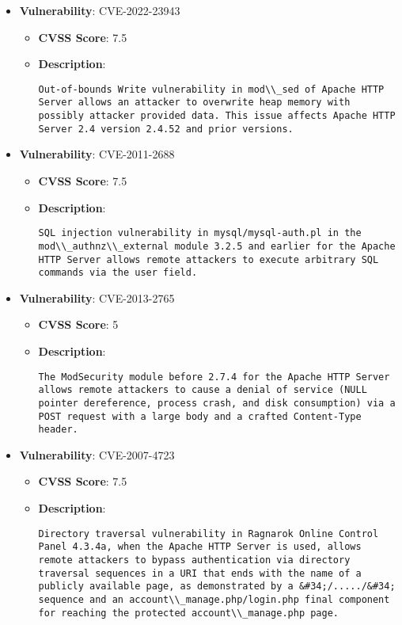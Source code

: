 \documentclass{article}
\begin{document}
\begin{itemize}
        \item \textbf{Vulnerability}: CVE-2022-23943
        \begin{itemize}
            \item \textbf{CVSS Score}:  7.5 
            \item \textbf{Description}:
            \parbox[t]{0.9\linewidth}{
                \verb|Out-of-bounds Write vulnerability in mod\\_sed of Apache HTTP Server allows an attacker to overwrite heap memory with possibly attacker provided data. This issue affects Apache HTTP Server 2.4 version 2.4.52 and prior versions.|
            }
        \end{itemize}
    
        \item \textbf{Vulnerability}: CVE-2011-2688
        \begin{itemize}
            \item \textbf{CVSS Score}:  7.5 
            \item \textbf{Description}:
            \parbox[t]{0.9\linewidth}{
                \verb|SQL injection vulnerability in mysql/mysql-auth.pl in the mod\\_authnz\\_external module 3.2.5 and earlier for the Apache HTTP Server allows remote attackers to execute arbitrary SQL commands via the user field.|
            }
        \end{itemize}
    
        \item \textbf{Vulnerability}: CVE-2013-2765
        \begin{itemize}
            \item \textbf{CVSS Score}:  5 
            \item \textbf{Description}:
            \parbox[t]{0.9\linewidth}{
                \verb|The ModSecurity module before 2.7.4 for the Apache HTTP Server allows remote attackers to cause a denial of service (NULL pointer dereference, process crash, and disk consumption) via a POST request with a large body and a crafted Content-Type header.|
            }
        \end{itemize}
    
        \item \textbf{Vulnerability}: CVE-2007-4723
        \begin{itemize}
            \item \textbf{CVSS Score}:  7.5 
            \item \textbf{Description}:
            \parbox[t]{0.9\linewidth}{
                \verb|Directory traversal vulnerability in Ragnarok Online Control Panel 4.3.4a, when the Apache HTTP Server is used, allows remote attackers to bypass authentication via directory traversal sequences in a URI that ends with the name of a publicly available page, as demonstrated by a &#34;/...../&#34; sequence and an account\\_manage.php/login.php final component for reaching the protected account\\_manage.php page.|
            }
        \end{itemize}
    

\end{itemize}
\end{document}
